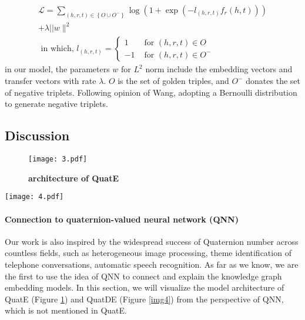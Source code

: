 \documentclass[letterpaper]{article} \usepackage{aaai20}  \usepackage{times}  \usepackage{helvet} \usepackage{courier}  \usepackage[hyphens]{url}  \usepackage{graphicx} \usepackage{lineno,hyperref,amsmath,amssymb}
\begin{document}
\begin{equation}
\begin{array}{c}
\mathcal{L}=\sum_{(h, r, t) \in\left\{O \cup O^{-}\right\}} \log \left(1+\exp \left(-l_{(h, r, t)} f_{r}(h, t)\right)\right)
\\ +\lambda|| w \|^{2} \\
\text { in which, } l_{(h, r, t)}=\left\{\begin{array}{cl}
1 & \text { for }(h, r, t) \in O \\
-1 & \text { for }(h, r, t) \in O^{-}
\end{array}\right.
\end{array}
\end{equation}in our model, the parameters $w$ for $L^2$ norm include the embedding vectors and transfer vectors with rate $\lambda$. $O$ is the set of golden triples, and $O^-$ donates the set of negative triplets. Following opinion of Wang\cite{wang2014knowledge}, adopting a Bernoulli distribution to generate negative triplets.

\subsection{Discussion}

\begin{figure}[h]
    \centering
    \texttt{[image: 3.pdf]}
    \caption{\textbf{architecture of QuatE}}
    \label{img3}
    \end{figure}
    
    \begin{figure*}[h]
    \centering
    \texttt{[image: 4.pdf]}
    \caption{\textbf{architecture of QuatDE}}
    \label{img4}
    \end{figure*}

\paragraph{\textbf{Connection to quaternion-valued neural network (QNN)}}Our work is also inspired by the widespread success of Quaternion number across countless fields, such as heterogeneous image processing\cite{parcollet2019quaternion}, theme identification of telephone conversations\cite{parcollet2017quaternion}, automatic speech recognition\cite{parcollet2018quaternion}. As far as we know, we are the first to use the idea of QNN to connect and explain the knowledge graph embedding models. In this section, we will visualize the model architecture of QuatE (Figure \ref{img3}) and QuatDE (Figure \ref{img4}) from the perspective of QNN, which is not mentioned in QuatE.
\end{document}
